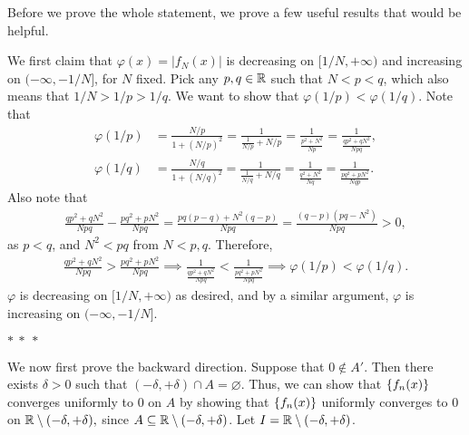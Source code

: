 \documentclass[12pt]{article}
\begin{document}
\begin{fproof}[1(b)]
    Before we prove the whole statement, we prove a few useful results that would be helpful.

    We first claim that \(\varphi(x) = |f_N(x)|\) is decreasing on \([1/N, +\infty)\) and increasing on \((-\infty, -1/N]\), for \(N\) fixed.
    Pick any \(p,q \in \mathbb {R}\) such that \(N < p < q\), which also means that \(1/N > 1/p > 1/q\).
    We want to show that \(\varphi(1/p) < \varphi(1/q)\).
    Note that
    \begin{align*}
        \varphi(1/p) &= \frac{N/p}{1 + (N/p)^2} = \frac{1}{\frac{1}{N/p} + N/p} = \frac{1}{\frac{p^2+N^2}{Np}} = \frac{1}{\frac{qp^2+qN^2}{Npq}},\\
        \varphi(1/q) &=\frac{N/q}{1 + (N/q)^2} = \frac{1}{\frac{1}{N/q} + N/q} = \frac{1}{\frac{q^2 + N^2}{Nq}} = \frac{1}{\frac{pq^2 + pN^2}{Nqp}}.
    \end{align*}
    Also note that
    \begin{align*}
        \frac{qp^2 + qN^2}{Npq} - \frac{pq^2 + pN^2}{Npq} = \frac{pq(p-q) + N^2(q-p)}{Npq} = \frac{(q-p)(pq - N^2)}{Npq} > 0,
    \end{align*}
    as \(p < q\), and \(N^2 < pq\) from \(N<p,q\).
    Therefore, 
    \begin{align*}
        \frac{qp^2 + qN^2}{Npq} > \frac{pq^2 + pN^2}{Npq} \implies \frac{1}{\frac{qp^2 + qN^2}{Npq}} < \frac{1}{\frac{pq^2 + pN^2}{Npq}} \implies \varphi(1/p) < \varphi(1/q).
    \end{align*}
    \(\varphi\) is decreasing on \([1/N, +\infty)\) as desired, and by a similar argument, \(\varphi\) is increasing on \((-\infty, -1/N]\).


    \begin{center}
        \(\ast~\ast~\ast\)
    \end{center}

    We now first prove the backward direction.
    Suppose that \(0 \notin A'\).
    Then there exists \(\delta>0\) such that \((-\delta, +\delta) \cap A = \varnothing.\)
    Thus, we can show that \(\left\{ f_n(x) \right\}\) converges uniformly to 0 on \(A\) by showing that \(\left\{ f_n(x) \right\}\) uniformly converges to \(0\) on \(\mathbb {R} \setminus (-\delta, +\delta),\) since \(A \subseteq \mathbb {R} \setminus (-\delta, +\delta)\).
    Let \(I = \mathbb {R} \setminus (-\delta, +\delta)\).


\end{fproof}
\end{document}
